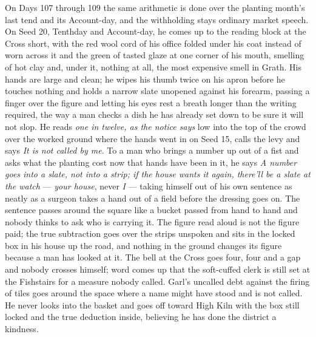 \documentclass{design/chronicle}
\begin{document}
{On Days 107 through 109 the same arithmetic is done over the planting month’s last tend and its Account-day, and the withholding stays ordinary market speech. On Seed 20, Tenthday and Account-day, he comes up to the reading block at the Cross short, with the red wool cord of his office folded under his coat instead of worn across it and the green of tasted glaze at one corner of his mouth, smelling of hot clay and, under it, nothing at all, the most expensive smell in Grath. His hands are large and clean; he wipes his thumb twice on his apron before he touches nothing and holds a narrow slate unopened against his forearm, passing a finger over the figure and letting his eyes rest a breath longer than the writing required, the way a man checks a dish he has already set down to be sure it will not slop. He reads \emph{one in twelve, as the notice says} low into the top of the crowd over the worked ground where the hands went in on Seed 15, calls the levy and says \emph{It is not called by me}. To a man who brings a number up out of a fist and asks what the planting cost now that hands have been in it, he says \emph{A number goes into a slate, not into a strip; if the house wants it again, there’ll be a slate at the watch} — \emph{your house}, never \emph{I} — taking himself out of his own sentence as neatly as a surgeon takes a hand out of a field before the dressing goes on. The sentence passes around the square like a bucket passed from hand to hand and nobody thinks to ask who is carrying it. The figure read aloud is not the figure paid; the true subtraction goes over the strips unspoken and sits in the locked box in his house up the road, and nothing in the ground changes its figure because a man has looked at it. The bell at the Cross goes four, four and a gap and nobody crosses himself; word comes up that the soft-cuffed clerk is still set at the Fishstairs for a measure nobody called. Garl’s uncalled debt against the firing of tiles goes around the space where a name might have stood and is not called. He never looks into the basket and goes off toward High Kiln with the box still locked and the true deduction inside, believing he has done the district a kindness.

}
\end{document}
